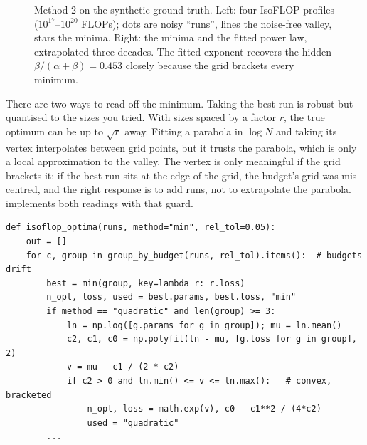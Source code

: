 \begin{figure}[t]
\caption{Method 2 on the synthetic ground truth. Left: four IsoFLOP profiles
($10^{17}$--$10^{20}$ FLOPs); dots are noisy ``runs'', lines the noise-free valley, stars the
minima. Right: the minima and the fitted power law, extrapolated three decades. The fitted
exponent recovers the hidden $\beta/(\alpha+\beta)=0.453$ closely because the grid brackets every
minimum.}
\label{fig:scalinglaws:isoflop}
\end{figure}

There are two ways to read off the minimum. Taking the best run is robust but quantised to the
sizes you tried. With sizes spaced by a factor $r$, the true optimum can be up to $\sqrt r$ away.
Fitting a parabola in $\log N$ and taking its vertex interpolates between grid points, but it
trusts the parabola, which is only a local approximation to the valley. The vertex is only
meaningful if the grid brackets it: if the best run sits at the edge of the grid, the budget's
grid was mis-centred, and the right response is to add runs, not to extrapolate the parabola.
 implements both readings with that guard.

\begin{lstlisting}[caption={IsoFLOP minima with a bracketing check (abridged from \code{llmsys/scaling.py}).},label={lst:scalinglaws:isoflop}]
def isoflop_optima(runs, method="min", rel_tol=0.05):
    out = []
    for c, group in group_by_budget(runs, rel_tol).items():  # budgets drift
        best = min(group, key=lambda r: r.loss)
        n_opt, loss, used = best.params, best.loss, "min"
        if method == "quadratic" and len(group) >= 3:
            ln = np.log([g.params for g in group]); mu = ln.mean()
            c2, c1, c0 = np.polyfit(ln - mu, [g.loss for g in group], 2)
            v = mu - c1 / (2 * c2)
            if c2 > 0 and ln.min() <= v <= ln.max():   # convex, bracketed
                n_opt, loss = math.exp(v), c0 - c1**2 / (4*c2)
                used = "quadratic"
        ...
\end{lstlisting}

